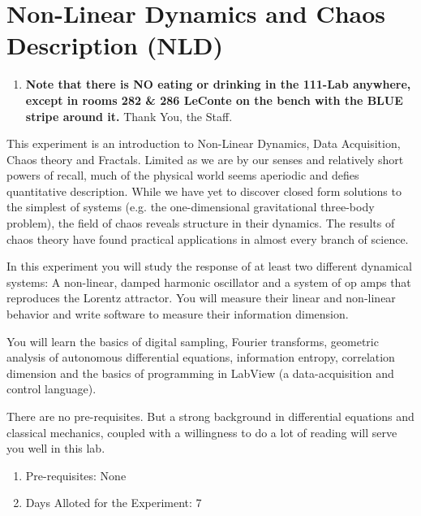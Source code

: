 \documentclass{../lab}
\begin{document}
\maketitle

\tableofcontents

\section{Non-Linear Dynamics and Chaos Description (NLD)}

\begin{enumerate}
    \item \textbf{Note that there is NO eating or drinking in the 111-Lab anywhere, except in rooms 282 \& 286 LeConte on the bench with the BLUE stripe around it.} Thank You, the Staff.

\end{enumerate}

This experiment is an introduction to Non-Linear Dynamics, Data Acquisition, Chaos theory and Fractals. Limited as we are by our senses and relatively short powers of recall, much of the physical world seems aperiodic and defies quantitative description. While we have yet to discover closed form solutions to the simplest of systems (e.g. the one-dimensional gravitational three-body problem), the field of chaos reveals structure in their dynamics. The results of chaos theory have found practical applications in almost every branch of science.

In this experiment you will study the response of at least two different dynamical systems: A non-linear, damped harmonic oscillator and a system of op amps that reproduces the Lorentz attractor. You will measure their linear and non-linear behavior and write software to measure their information dimension.

You will learn the basics of digital sampling, Fourier transforms, geometric analysis of autonomous differential equations, information entropy, correlation dimension and the basics of programming in LabView (a data-acquisition and control language).

There are no pre-requisites. But a strong background in differential equations and classical mechanics, coupled with a willingness to do a lot of reading will serve you well in this lab.

\begin{enumerate}
    \item Pre-requisites: None

    \item Days Alloted for the Experiment: 7

\end{enumerate}
\end{document}
